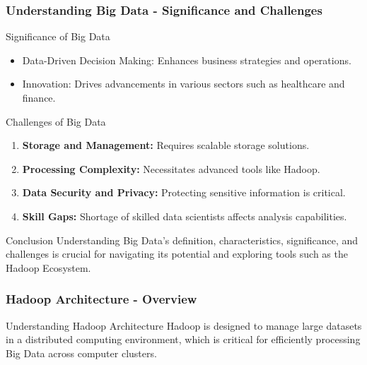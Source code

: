 \documentclass[aspectratio=169]{beamer}
\begin{document}
\begin{frame}[fragile]
    \frametitle{Understanding Big Data - Significance and Challenges}
    \begin{block}{Significance of Big Data}
        \begin{itemize}
            \item Data-Driven Decision Making: Enhances business strategies and operations.
            \item Innovation: Drives advancements in various sectors such as healthcare and finance.
        \end{itemize}
    \end{block}
    
    \begin{block}{Challenges of Big Data}
        \begin{enumerate}
            \item \textbf{Storage and Management:} Requires scalable storage solutions.
            \item \textbf{Processing Complexity:} Necessitates advanced tools like Hadoop.
            \item \textbf{Data Security and Privacy:} Protecting sensitive information is critical.
            \item \textbf{Skill Gaps:} Shortage of skilled data scientists affects analysis capabilities.
        \end{enumerate}
    \end{block}
    
    \begin{block}{Conclusion}
        Understanding Big Data's definition, characteristics, significance, and challenges is crucial for navigating its potential and exploring tools such as the Hadoop Ecosystem.
    \end{block}
\end{frame}

\begin{frame}[fragile]
    \frametitle{Hadoop Architecture - Overview}
    \begin{block}{Understanding Hadoop Architecture}
        Hadoop is designed to manage large datasets in a distributed computing environment, which is critical for efficiently processing Big Data across computer clusters.
    \end{block}
\end{frame}
\end{document}
